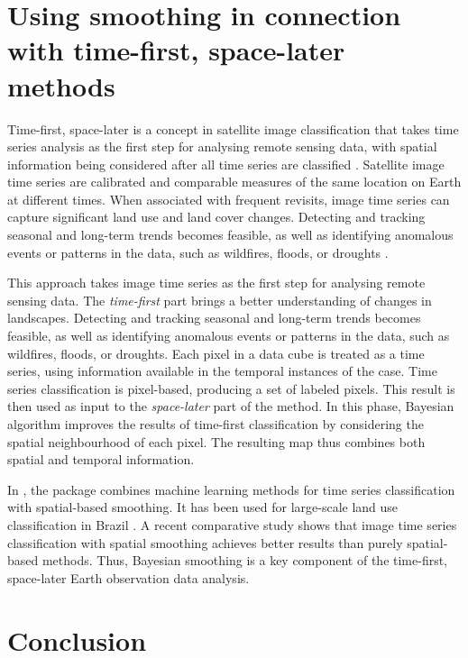 \documentclass[
  shortnames]{jss}
\begin{document}
\FloatBarrier

\section{Using smoothing in connection with time-first, space-later methods}\label{using-smoothing-in-connection-with-time-first-space-later-methods}

Time-first, space-later is a concept in satellite image classification that takes time series analysis as the first step for analysing remote sensing data, with spatial information being considered after all time series are classified \citep{Camara2016}. Satellite image time series are calibrated and comparable measures of the same location on Earth at different times. When associated with frequent revisits, image time series can capture significant land use and land cover changes. Detecting and tracking seasonal and long-term trends becomes feasible, as well as identifying anomalous events or patterns in the data, such as wildfires, floods, or droughts \cite{Woodcock2020}.

This approach takes image time series as the first step for analysing remote sensing data. The \textit{time-first} part brings a better understanding of changes in landscapes. Detecting and tracking seasonal and long-term trends becomes feasible, as well as identifying anomalous events or patterns in the data, such as wildfires, floods, or droughts. Each pixel in a data cube is treated as a time series, using information available in the temporal instances of the case. Time series classification is pixel-based, producing a set of labeled pixels. This result is then used as input to the \textit{space-later} part of the method. In this phase, Bayesian algorithm improves the results of time-first classification by considering the spatial neighbourhood of each pixel. The resulting map thus combines both spatial and temporal information.

In , the  package combines machine learning methods for time series classification with spatial-based smoothing\citep{Simoes2021}. It has been used for large-scale land use classification in Brazil \cite{Picoli2018}. A recent comparative study shows that image time series classification with spatial smoothing achieves better results than purely spatial-based methods\citep{Hadi2023}. Thus, Bayesian smoothing is a key component of the time-first, space-later Earth observation data analysis.

\section{Conclusion}\label{conclusion}
\end{document}
